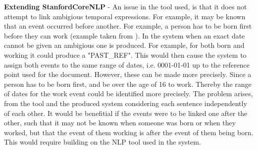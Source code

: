 \par \textbf{Extending StanfordCoreNLP} - An issue in the tool used, is that it does not attempt to link ambigious temporal expressions. For example, it may be known that an event occurred before another. For example, a person has to be born first before they can work (example taken from \cite{mccloskymanning2012}). In the system when an exact date cannot be given an ambigious one is produced. For example, for both born and working it could produce a "PAST\_REF". This would then cause the system to assign both events to the same range of dates, i.e. 0001-01-01 up to the reference point used for the document. However, these can be made more precisely.  Since a person has to be born first, and be over the age of 16 to work. Thereby the range of dates for the work event could be identified more precisely. The problem arises, from the tool and the produced system considering each sentence independently of each other. It would be benefitial if the events were to be linked one after the other, such that it may not be known when someone was born or when they worked, but that the event of them working is after the event of them being born. This would require building on the NLP tool used in the system.